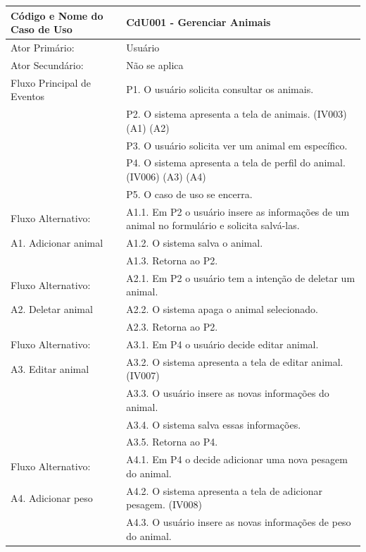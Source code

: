 \documentclass[12pt]{article}
\begin{document}
\begin{titlepage}
\begin{center}
  \begin{tabular}{ | l |  p{10cm} |}
    \hline
    Código e Nome do Caso de Uso & CdU001 - Gerenciar Animais \\ \hline
    Ator Primário: & Usuário \\ 
    Ator Secundário: & Não se aplica \\ \hline
    Fluxo Principal de Eventos & P1. O usuário solicita consultar os animais. \\
                               & P2. O sistema apresenta a tela de animais. (IV003) (A1) (A2) \\
                               & P3. O usuário solicita ver um animal em específico. \\
			       & P4. O sistema apresenta a tela de perfil do animal. (IV006) (A3) (A4)  \\
                               & P5. O caso de uso se encerra. \\ \hline
    Fluxo Alternativo:         & A1.1. Em P2 o usuário insere as informações de um animal no formulário e solicita salvá-las. \\
    A1. Adicionar animal       & A1.2. O sistema salva o animal. \\ 
			       & A1.3. Retorna ao P2. \\ \hline
    Fluxo Alternativo:         & A2.1. Em P2 o usuário tem a intenção de deletar um animal. \\
    A2. Deletar animal         & A2.2. O sistema apaga o animal selecionado. \\
			       & A2.3. Retorna ao P2. \\ \hline
    Fluxo Alternativo:         & A3.1. Em P4 o usuário decide editar animal. \\
    A3. Editar animal          & A3.2. O sistema apresenta a tela de editar animal. (IV007) \\
			       & A3.3. O usuário insere as novas informações do animal. \\
                               & A3.4. O sistema salva essas informações. \\
			       & A3.5. Retorna ao P4. \\ \hline
    Fluxo Alternativo:         & A4.1. Em P4 o decide adicionar uma nova pesagem do animal. \\
    A4. Adicionar peso         & A4.2. O sistema apresenta a tela de adicionar pesagem. (IV008) \\
			       & A4.3. O usuário insere as novas informações de peso do animal. \\

\end{tabular}
\end{center}
\end{titlepage}
\end{document}
